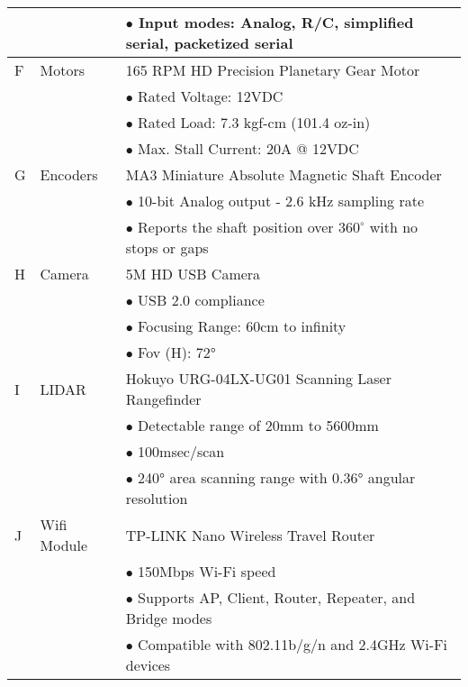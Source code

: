\begin{longtable}{| l | p{3cm} | p{10cm} |}
	 		\\ & & $ \bullet $ Input modes: Analog, R/C, simplified serial, packetized serial
 		\\ \hline
 		F & Motors & 165 RPM HD Precision Planetary Gear Motor
 			\\ & & $ \bullet $ Rated Voltage: 12VDC
 			\\ & & $ \bullet $ Rated Load: 7.3 kgf-cm (101.4 oz-in)
 			\\ & & $ \bullet $ Max. Stall Current: 20A @ 12VDC
 		\\ \hline
 		G & Encoders & MA3 Miniature Absolute Magnetic Shaft Encoder
 			\\ & & $ \bullet $ 10-bit Analog output - 2.6 kHz sampling rate
 			\\ & & $ \bullet $ Reports the shaft position over $ 360^\circ $ with no stops or gaps
 		\\ \hline
 		H & Camera & 5M HD USB Camera
 			\\ & & $ \bullet $ USB 2.0 compliance
  			\\ & & $ \bullet $ Focusing Range: 60cm to infinity	
   			\\ & & $ \bullet $ Fov (H): 72°
 		\\ \hline
 		I & LIDAR &  Hokuyo URG-04LX-UG01 Scanning Laser Rangefinder
 			\\ & & $ \bullet $ Detectable range of 20mm to 5600mm
 			\\ & & $ \bullet $ 100msec/scan
 			\\ & & $ \bullet $ 240° area scanning range with 0.36° angular resolution
 		\\ \hline
 		J & Wifi Module & TP-LINK Nano Wireless Travel Router
 			\\ & & $ \bullet $ 150Mbps Wi-Fi speed
 			\\ & & $ \bullet $ Supports AP, Client, Router, Repeater, and Bridge modes
 			\\ & & $ \bullet $ Compatible with 802.11b/g/n and 2.4GHz Wi-Fi devices
 			 			 			 		
 		\\ \hline 
	\end{longtable}


